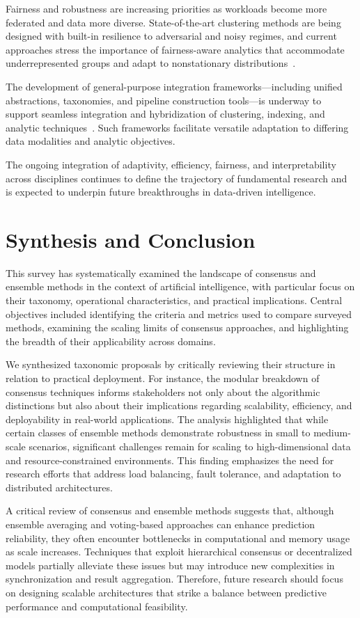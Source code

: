 \documentclass[sigconf]{acmart}
\begin{document}
Fairness and robustness are increasing priorities as workloads become more federated and data more diverse. State-of-the-art clustering methods are being designed with built-in resilience to adversarial and noisy regimes, and current approaches stress the importance of fairness-aware analytics that accommodate underrepresented groups and adapt to nonstationary distributions~\cite{ref116,ref117}.

The development of general-purpose integration frameworks—including unified abstractions, taxonomies, and pipeline construction tools—is underway to support seamless integration and hybridization of clustering, indexing, and analytic techniques~\cite{ref110}. Such frameworks facilitate versatile adaptation to differing data modalities and analytic objectives.

The ongoing integration of adaptivity, efficiency, fairness, and interpretability across disciplines continues to define the trajectory of fundamental research and is expected to underpin future breakthroughs in data-driven intelligence.

\section{Synthesis and Conclusion}
This survey has systematically examined the landscape of consensus and ensemble methods in the context of artificial intelligence, with particular focus on their taxonomy, operational characteristics, and practical implications. Central objectives included identifying the criteria and metrics used to compare surveyed methods, examining the scaling limits of consensus approaches, and highlighting the breadth of their applicability across domains.

We synthesized taxonomic proposals by critically reviewing their structure in relation to practical deployment. For instance, the modular breakdown of consensus techniques informs stakeholders not only about the algorithmic distinctions but also about their implications regarding scalability, efficiency, and deployability in real-world applications. The analysis highlighted that while certain classes of ensemble methods demonstrate robustness in small to medium-scale scenarios, significant challenges remain for scaling to high-dimensional data and resource-constrained environments. This finding emphasizes the need for research efforts that address load balancing, fault tolerance, and adaptation to distributed architectures.

A critical review of consensus and ensemble methods suggests that, although ensemble averaging and voting-based approaches can enhance prediction reliability, they often encounter bottlenecks in computational and memory usage as scale increases. Techniques that exploit hierarchical consensus or decentralized models partially alleviate these issues but may introduce new complexities in synchronization and result aggregation. Therefore, future research should focus on designing scalable architectures that strike a balance between predictive performance and computational feasibility. 
\end{document}
